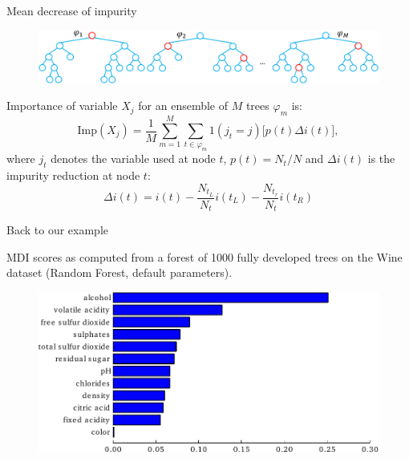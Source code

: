 \documentclass{beamer}
\begin{document}
\begin{frame}{Mean decrease of impurity}

\begin{figure}
    \includegraphics[scale=0.4]{./figures/mdi.pdf}
\end{figure}

Importance of variable $X_j$ for an ensemble of $M$ trees $\varphi_{m}$ is:
\begin{equation*}
\text{Imp}(X_j) = \frac{1}{M} \sum_{m=1}^M \sum_{t \in \varphi_{m}} 1(j_t = j) \Big[ p(t) \Delta i(t) \Big],
\end{equation*}
where $j_t$ denotes the variable used at node $t$, $p(t)=N_t/N$ and $\Delta i(t)$ is the impurity reduction at node $t$:
\begin{equation*}
\Delta i(t) = i(t) - \frac{N_{t_L}}{N_t} i(t_L) - \frac{N_{t_r}}{N_t} i(t_R)
\end{equation*}

\end{frame}

\begin{frame}{Back to our example}

MDI scores as computed from a forest of 1000 fully developed trees on the  Wine
dataset (Random Forest, default parameters).

\begin{figure}
    \includegraphics[scale=0.7]{./figures/imp-wine.pdf}
\end{figure}

\end{frame}
\end{document}
